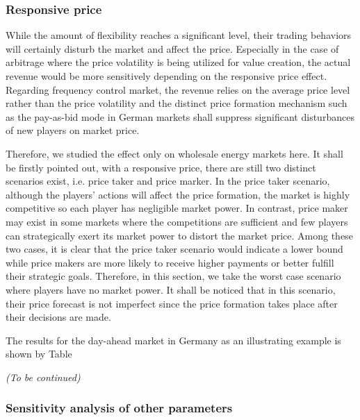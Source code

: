\subsubsection{Responsive price}
While the amount of flexibility reaches a significant level, their trading behaviors will certainly disturb the market and affect the price. Especially in the case of arbitrage where the price volatility is being utilized for value creation, the actual revenue would be more sensitively depending on the responsive price effect. Regarding frequency control market, the revenue relies on the average price level rather than the price volatility and the distinct price formation mechanism such as the pay-as-bid mode in German markets shall suppress significant disturbances of new players on market price. 

Therefore, we studied the effect only on wholesale energy markets here. It shall be firstly pointed out, with a responsive price, there are still two distinct scenarios exist, i.e. price taker and price marker. In the price taker scenario, although the players' actions will affect the price formation, the market is highly competitive so each player has negligible market power. In contrast, price maker may exist in some markets where the competitions are sufficient and few players can strategically exert its market power to distort the market price. Among these two cases, it is clear that the price taker scenario would indicate a lower bound while price makers are more likely to receive higher payments or better fulfill their strategic goals. Therefore, in this section, we take the worst case scenario where players have no market power. It shall be noticed that in this scenario, their price forecast is not imperfect since the price formation takes place after their decisions are made. 

The results for the day-ahead market in Germany as an illustrating example is shown by Table

\textit{(To be continued)}
\subsubsection{Sensitivity analysis of other parameters}





